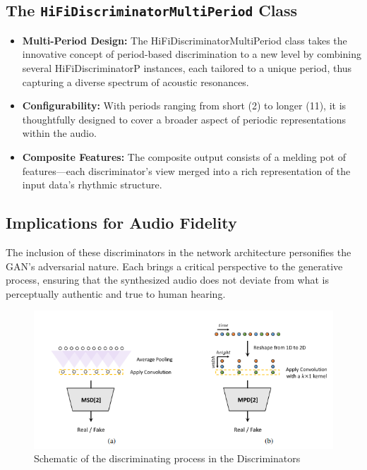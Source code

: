\documentclass[a4paper]{article}
\begin{document}
\subsection{The \texttt{HiFiDiscriminatorMultiPeriod} Class}

\begin{itemize}
  
  \item \textbf{Multi-Period Design:} The HiFiDiscriminatorMultiPeriod class takes the innovative concept of period-based discrimination to a new level by combining several HiFiDiscriminatorP instances, each tailored to a unique period, thus capturing a diverse spectrum of acoustic resonances.
  
  \item \textbf{Configurability:} With periods ranging from short (2) to longer (11), it is thoughtfully designed to cover a broader aspect of periodic representations within the audio.
  
  \item \textbf{Composite Features:} The composite output consists of a melding pot of features—each discriminator's view merged into a rich representation of the input data's rhythmic structure.

\end{itemize}

\subsection{Implications for Audio Fidelity}

The inclusion of these discriminators in the network architecture personifies the GAN's adversarial nature. Each brings a critical perspective to the generative process, ensuring that the synthesized audio does not deviate from what is perceptually authentic and true to human hearing.

\begin{figure}[ht]
  \centering
  \includegraphics[width=\linewidth]{hifigan-discriminators.png}
  \caption{Schematic of the discriminating process in the Discriminators}
  \label{fig:hifigan-discriminators}
\end{figure}
\end{document}
